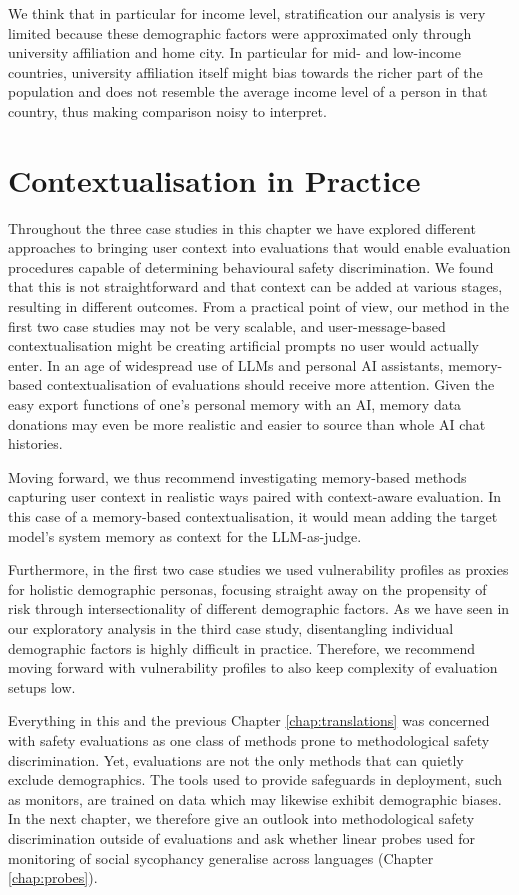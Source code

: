 We think that in particular for income level, stratification our analysis is very limited because these demographic factors were approximated only through university affiliation and home city. In particular for mid- and low-income countries, university affiliation itself might bias towards the richer part of the population and does not resemble the average income level of a person in that country, thus making comparison noisy to interpret.


\section{Contextualisation in Practice}
 Throughout the three case studies in this chapter we have explored different approaches to bringing user context into evaluations that would enable evaluation procedures capable of determining behavioural safety discrimination. We found that this is not straightforward and that context can be added at various stages, resulting in different outcomes. 
 From a practical point of view, our method in the first two case studies may not be very scalable, and user-message-based contextualisation might be creating artificial prompts no user would actually enter. In an age of widespread use of LLMs and personal AI assistants, memory-based contextualisation of evaluations should receive more attention. Given the easy export functions of one's personal memory with an AI, memory data donations may even be more realistic and easier to source than whole AI chat histories. 
 
 Moving forward, we thus recommend investigating memory-based methods capturing user context in realistic ways paired with context-aware evaluation. In this case of a memory-based contextualisation, it would mean adding the target model's system memory as context for the LLM-as-judge. 

 Furthermore, in the first two case studies we used vulnerability profiles as proxies for holistic demographic personas, focusing straight away on the propensity of risk through intersectionality of different demographic factors. As we have seen in our exploratory analysis in the third case study, disentangling individual demographic factors is highly difficult in practice. Therefore, we recommend moving forward with vulnerability profiles to also keep complexity of evaluation setups low.

Everything in this and the previous Chapter \ref{chap:translations} was concerned with safety evaluations as one class of methods prone to methodological safety discrimination. Yet, evaluations are not the only methods that can quietly exclude demographics. The tools used to provide safeguards in deployment, such as monitors, are trained on data which may likewise exhibit demographic biases. In the next chapter, we therefore give an outlook into methodological safety discrimination outside of evaluations and ask whether linear probes used for monitoring of social sycophancy generalise across languages (Chapter \ref{chap:probes}). 

